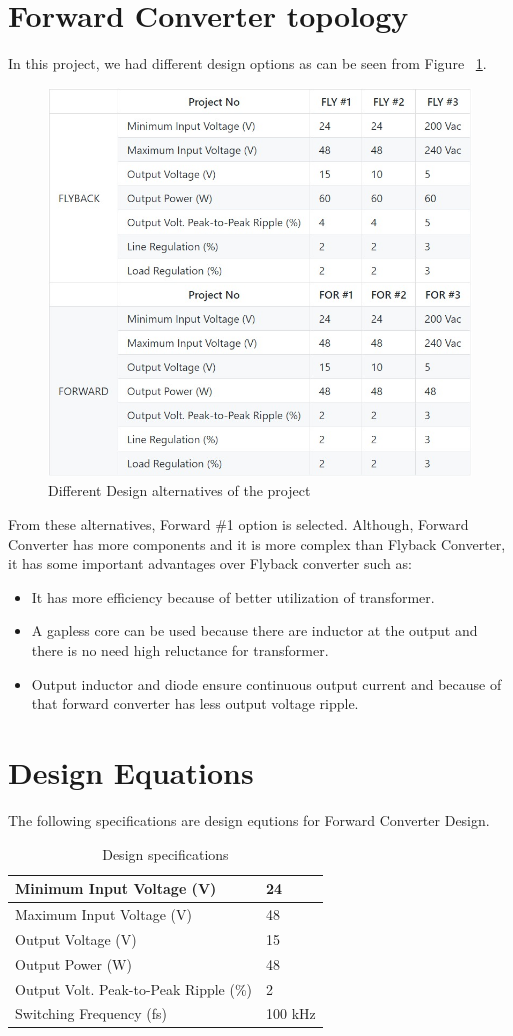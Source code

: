 \documentclass{article}
\begin{document}
\section{Forward Converter topology}
In this project, we had different design options as can be seen from Figure ~\ref{fig:projects}.
\begin{figure}[H]
    \centering
    \includegraphics[width=0.5\linewidth]{projects.jpeg}
    \caption {Different Design alternatives of the project}
    \label{fig:projects}
\end{figure}

From these alternatives, Forward \#1 option is selected. Although, Forward Converter has more components and it is more complex than Flyback Converter, it has some important advantages over Flyback converter such as:
\begin{itemize}
    \item It has more efficiency because of better utilization of transformer.
    \item A gapless core can be used because there are inductor at the output and there is no need high reluctance for transformer.
    \item Output inductor and diode ensure continuous output current and because of that forward converter has less output voltage ripple.
\end{itemize}


\section{Design Equations}
The following specifications are design equtions for Forward Converter Design.
\begin{table}[H]
    \centering
\begin{tabular}{|l|l|}
    \hline
    Minimum Input Voltage (V)             & 24      \\ \hline
    Maximum Input Voltage (V)             & 48      \\ \hline
    Output Voltage (V)                    & 15      \\ \hline
    Output Power (W)                      & 48      \\ \hline
    Output Volt. Peak-to-Peak Ripple (\%) & 2       \\ \hline
    Switching Frequency (fs)              & 100 kHz \\ \hline
\end{tabular}
\caption {Design specifications}
\end{table}
\end{document}
